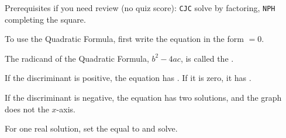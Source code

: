\vspace{2pt}
Prerequisites if you need review (no quiz score): \texttt{CJC} solve by factoring, \texttt{NPH} completing the square.

To use the Quadratic Formula, first write the equation in the form \blank[3.5cm] $=0$.

The radicand of the Quadratic Formula, $b^2-4ac$, is called the \blank[3cm].

If the discriminant is positive, the equation has \blank[2.8cm]. If it is zero, it has \blank[2.8cm].

If the discriminant is negative, the equation has two \blank[2.5cm] solutions, and the graph does not \blank[2.5cm] the $x$-axis.

For one real solution, set the \blank[3cm] equal to \blank[1cm] and solve.


